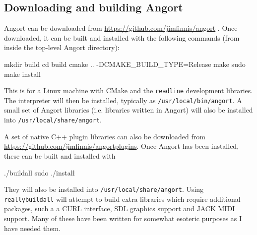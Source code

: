\subsection{Downloading and building Angort}
Angort can be downloaded from \url{https://github.com/jimfinnis/angort} .
Once downloaded, it can be built and installed 
with the following commands (from
inside the top-level Angort directory):
\begin{v}
mkdir build
cd build
cmake .. -DCMAKE_BUILD_TYPE=Release
make
sudo make install
\end{v}
This is for a Linux machine
with CMake and the \texttt{readline} development libraries. The
interpreter will then be installed, typically as \texttt{/usr/local/bin/angort}. 
A small set of Angort libraries (i.e. libraries written in Angort) will also be installed
into \texttt{/usr/local/share/angort}.

A set
of native C++ plugin libraries can also be downloaded from
\url{https://github.com/jimfinnis/angortplugins}. Once Angort has
been installed, these can be built and installed with
\begin{v}
./buildall
sudo ./install
\end{v}
They will also be installed into \texttt{/usr/local/share/angort}.
Using \texttt{reallybuildall} will attempt to build extra libraries
which require additional packages, such a a CURL interface, SDL
graphics support and JACK MIDI support. Many of these have been written for
somewhat esoteric purposes as I have needed them.



